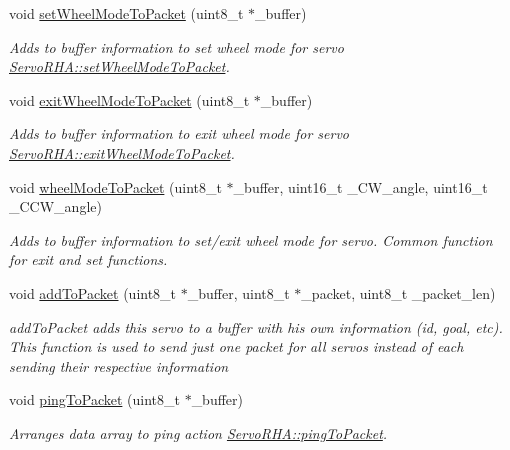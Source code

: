 \begin{DoxyCompactItemize}
void \hyperlink{classServoRHA_af7b04ba94b6bc8c2826eb124d220be90}{set\+Wheel\+Mode\+To\+Packet} (uint8\+\_\+t $\ast$\+\_\+buffer)
\begin{DoxyCompactList}\small\item\em Adds to buffer information to set wheel mode for servo  \hyperlink{classServoRHA_af7b04ba94b6bc8c2826eb124d220be90}{Servo\+R\+H\+A\+::set\+Wheel\+Mode\+To\+Packet}. \end{DoxyCompactList}\item 
void \hyperlink{classServoRHA_aae6bc579a9fe9fa4539fa1634bc24682}{exit\+Wheel\+Mode\+To\+Packet} (uint8\+\_\+t $\ast$\+\_\+buffer)
\begin{DoxyCompactList}\small\item\em Adds to buffer information to exit wheel mode for servo  \hyperlink{classServoRHA_aae6bc579a9fe9fa4539fa1634bc24682}{Servo\+R\+H\+A\+::exit\+Wheel\+Mode\+To\+Packet}. \end{DoxyCompactList}\item 
void \hyperlink{classServoRHA_ab496955f29decba4cc13de528344cd5e}{wheel\+Mode\+To\+Packet} (uint8\+\_\+t $\ast$\+\_\+buffer, uint16\+\_\+t \+\_\+\+C\+W\+\_\+angle, uint16\+\_\+t \+\_\+\+C\+C\+W\+\_\+angle)
\begin{DoxyCompactList}\small\item\em Adds to buffer information to set/exit wheel mode for servo. Common function for exit and set functions. \end{DoxyCompactList}\item 
void \hyperlink{classServoRHA_a7f186059f8e620f183b0eca943e9edfa}{add\+To\+Packet} (uint8\+\_\+t $\ast$\+\_\+buffer, uint8\+\_\+t $\ast$\+\_\+packet, uint8\+\_\+t \+\_\+packet\+\_\+len)
\begin{DoxyCompactList}\small\item\em add\+To\+Packet adds this servo to a buffer with his own information (id, goal, etc). This function is used to send just one packet for all servos instead of each sending their respective information \end{DoxyCompactList}\item 
void \hyperlink{classServoRHA_ae3b7cc86e70cea8c0cebcc40d9253569}{ping\+To\+Packet} (uint8\+\_\+t $\ast$\+\_\+buffer)
\begin{DoxyCompactList}\small\item\em Arranges data array to ping action  \hyperlink{classServoRHA_ae3b7cc86e70cea8c0cebcc40d9253569}{Servo\+R\+H\+A\+::ping\+To\+Packet}. \end{DoxyCompactList}\item 

\end{DoxyCompactItemize}
